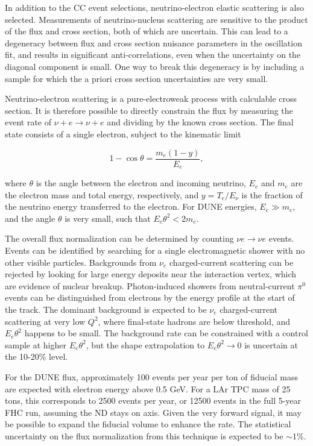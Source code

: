In addition to the CC event selections, neutrino-electron elastic scattering is also selected. Measurements of neutrino-nucleus scattering are sensitive to the product of the flux and cross section, both of which are uncertain. This can lead to a degeneracy between flux and cross section nuisance parameters in the oscillation fit, and results in significant anti-correlations, even when the uncertainty on the diagonal component is small. One way to break this degeneracy is by including a sample for which the a priori cross section uncertainties are very small. 

Neutrino-electron scattering is a pure-electroweak process with calculable cross section. It is therefore possible to directly constrain the flux by measuring the event rate of $\nu+ e \rightarrow \nu +e$ and dividing by the known cross section. The final state consists of a single electron, subject to the kinematic limit 

\begin{equation}
1 - \cos \theta = \frac{m_{e}(1-y)}{E_{e}},
\end{equation}

where $\theta$ is the angle between the electron and incoming neutrino, $E_{e}$ and $m_{e}$ are the electron mass and total energy, respectively, and $y = T_{e}/E_{\nu}$ is the fraction of the neutrino energy transferred to the electron. For DUNE energies, $E_{e} \gg m_{e}$, and the angle $\theta$ is very small, such that $E_{e}\theta^{2} < 2m_{e}$.

The overall flux normalization can be determined by counting $\nu e \rightarrow \nu e$ events. Events can be identified by searching for a single electromagnetic shower with no other visible particles. Backgrounds from $\nu_{e}$ charged-current scattering can be rejected by looking for large energy deposits near the interaction vertex, which are evidence of nuclear breakup. Photon-induced showers from neutral-current $\pi^{0}$ events can be distinguished from electrons by the energy profile at the start of the track. The dominant background is expected to be $\nu_{e}$ charged-current scattering at very low $Q^{2}$, where final-state hadrons are below threshold, and $E_{e}\theta^{2}$ happens to be small. The background rate can be constrained with a control sample at higher $E_{e}\theta^{2}$, but the shape extrapolation to $E_{e}\theta^{2} \rightarrow 0$ is uncertain at the 10-20\% level.

For the DUNE flux, approximately 100 events per year per ton of fiducial mass are expected with electron energy above 0.5 GeV. For a LAr TPC mass of 25 tons, this corresponds to 2500 events per year, or 12500 events in the full 5-year FHC run, assuming the ND stays on axis. Given the very forward signal, it may be possible to expand the fiducial volume to enhance the rate. The statistical uncertainty on the flux normalization from this technique is expected to be $\sim$1\%.

